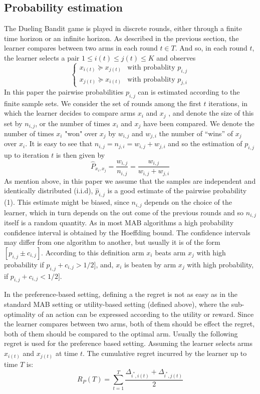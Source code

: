 \documentclass{llncs}
\begin{document}
	\subsection{Probability estimation}		 
		The Dueling Bandit game is played in discrete rounds, either through a finite time horizon or an infinite horizon. 
		 As described in the previous section, the learner compares between two arms in each round $t \in T$. 
		 And so, in each round $t$, the learner selects a pair $1 \leq i(t) \leq j(t) \leq K$ and observes
	\begin{equation}
		\begin{cases}
    		x_{i(t)} \succeq x_{j(t)} & \text{with probablity } p_{i,j} 
       	\\
    		x_{j(t)} \succeq x_{i(t)} & \text{with probablity } p_{j,i}
	\end{cases}
	\end{equation}		
	In this paper the pairwise probabilities $p_{i,j}$ can is estimated according to the finite sample sets.
	We consider the set of rounds among the first $t$ iterations, in which the learner decides to compare arms $x_i$ and $x_j$ , and denote the size of this set by $n_{i,j}$, or the number of times $x_i$ and $x_j$ have been compared.  
	We denote the number of times $x_i$ "won" over $x_j$ by $w_{i,j}$ and $w_{j,i}$ the number of “wins” of $x_j$ over $x_i$.
	It is easy to see that $n_{i,j} = n_{j,i} = w_{i,j}+w_{j,i}$ and so the estimation of $p_{i,j}$ up to iteration $t$ is then given by
	$$ 
		\hat{P}_{x_i, x_j} = \frac{w_{i,j}}{n_{i,j}} = 
		\frac{w_{i,j}}{w_{i,j}+w_{j,i}}
	$$
	As mention above, in this paper we assume that the samples are independent and identically distributed (i.i.d), $\hat{p}_{i,j}$ is a good estimate of the pairwise probability (1). 
	This estimate might be biased, since $n_{i,j}$ depends on the choice of the learner, which in turn depends on the out come of the previous rounds and so $n_{i,j}$ itself is a random quantity.
	As in most MAB algorithms a high probability confidence interval is obtained by the Hoeffding bound. 
	The confidence intervals may differ from one algorithm to another, but usually it is of the form $[p_{i,j} \pm c_{i,j} ]$. 
	According to this definition arm $x_{i}$ beats arm $x_{j}$ with high probability 	if $p_{i,j} + c_{i,j} > 1/2]$, and, $x_{i}$ is beaten by arm $x_{j}$ with high probability, if $p_{i,j} + c_{i,j} < 1/2]$.
	
	In the preference-based setting, defining a the regret is not as easy as in the standard MAB setting or utility-based setting (defined above), where the sub-optimality of an action can be expressed according to the utility or reward. 
	Since the learner compares between two arms, both of them should be effect the regret, both of them should be compared to the optimal arm.
	Usually the following regret is used for the preference based setting.
	Assuming the learner selects arms $x_{i(t)}$ and $x_{j(t)}$ at time $t$.
	The cumulative regret incurred by the learner up to time $T$ is:
	\begin{equation}
	R_P(T) = \sum_{t=1}^T \frac{\Delta_{i^*,i(t)}+\Delta_{i^*,j(t)}}{2} 
	\end{equation}	 
	
\end{document}
